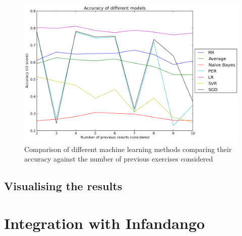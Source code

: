 \begin{figure}[p]
\centering
\includegraphics[width=1\textwidth]{comparison.png}
\caption{Comparison of different machine learning methods comparing their accuracy against the number of previous exercises considered}
\label{fig:comparison}
\end{figure}


\subsection{Visualising the results}

\section{Integration with Infandango}
